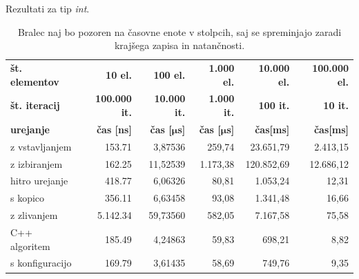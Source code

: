 \documentclass[a4paper,oneside,12pt]{article}
\newcommand{\bmu}{\ensuremath{\boldsymbol{\mu}}}
\newcommand{\usec}{\ensuremath{\bmu}s}
\begin{document}
\begin{table}[h!]
  \caption[Rezultati za tip \emph{int}]{Rezultati za tip \emph{int}.}
  \caption*{{\small Bralec naj bo pozoren na časovne enote
  v stolpcih, saj se spreminjajo zaradi krajšega zapisa in natančnosti.}}
  \label{tab:rez:int} \vspace{1ex}
  \begin{tabular}{l!{\vrule width 1pt}r|r|r|r|r}
    \bf št. elementov    & \bf 10 el.& \bf 100 el.& \bf 1.000 el. & \bf 10.000 el. & \bf 100.000 el. \\ 
    \bf št. iteracij     & \bf 100.000 it. & \bf 10.000 it. & \bf 1.000 it. & \bf 100 it. &  \bf 10 it.\\ \hline
    \bf urejanje         & \bf čas [ns] & \bf čas [\usec] & \bf čas [\usec] & \bf čas[ms] & \bf čas[ms] \\  
    z vstavljanjem       &   153.71 &  3,87536 &  259,74  &  23.651,79  &  2.413,15 \\ \hline
    z izbiranjem         &   162.25 & 11,52539 & 1.173,38 & 120.852,69  & 12.686,12 \\ \hline
    hitro urejanje       &   418.77 &  6,06326 &   80,81  &   1.053,24  &     12,31 \\ \hline
    s kopico             &   356.11 &  6,63458 &   93,08  &   1.341,48  &     16,66 \\ \hline
    z zlivanjem          & 5.142.34 & 59,73560 &  582,05  &   7.167,58  &     75,58 \\ \hline
    C++ algoritem        &   185.49 &  4,24863 &   59,83  &     698,21  &      8,82 \\ \hline
    s konfiguracijo      &   169.79 &  3,61435 &   58,69  &     749,76  &      9,35 \\ 
  \end{tabular}
\end{table}
\end{document}
